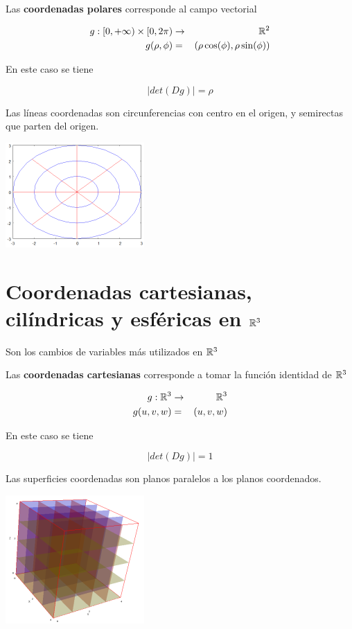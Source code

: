 \begin{definition}[Polares] 
Las \textbf{coordenadas polares} corresponde al campo vectorial

\begin{eqnarray*} g : [0, +\infty) \times [0, 2\pi) &\to& \mathbb{R}^2 \\
 g(\rho, \phi) &=& ( \rho \cos(\phi), \rho \sin(\phi) ) \end{eqnarray*}

En este caso se tiene

$$ |det(Dg)| = \rho $$

Las líneas coordenadas son circunferencias con centro en el origen, y semirectas que parten del origen.

\begin{center}
\includegraphics{images/04_analisis2/coord_polares.png}
\end{center}
\end{definition}

\section{Coordenadas cartesianas, cilíndricas y esféricas en $\mathbb{R}^3$}

Son los cambios de variables más utilizados en $\mathbb{R}^3$

\begin{definition}[Cartesianas]
Las \textbf{coordenadas cartesianas} corresponde a tomar la función identidad de $\mathbb{R}^3$

\begin{eqnarray*} g: \mathbb{R}^3 &\to& \mathbb{R}^3 \\
g(u,v,w) &=& (u,v,w) \end{eqnarray*}

En este caso se tiene

$$ |det(Dg)| = 1$$

Las superficies coordenadas son planos paralelos a los planos coordenados.

\begin{center}
\includegraphics{images/04_analisis2/coord_cart3d.png}
\end{center}
\end{definition}

